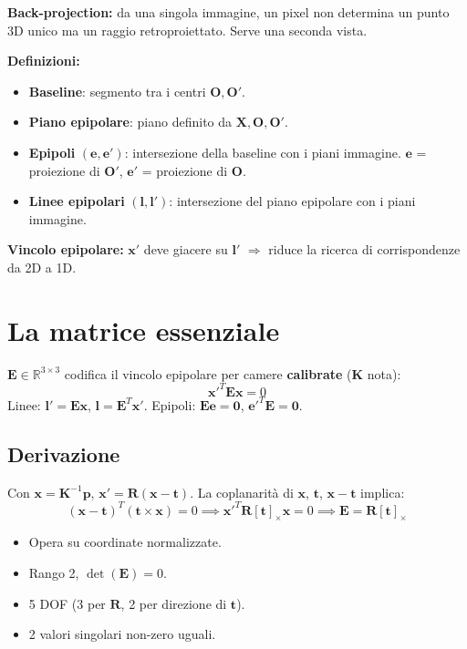 \documentclass[12pt, a4paper]{report}
\newcommand{\R}{\mathbb{R}}
\begin{document}
\textbf{Back-projection:} da una singola immagine, un pixel non determina un
punto 3D unico ma un raggio retroproiettato. Serve una seconda vista.

\textbf{Definizioni:}
\begin{itemize}
  \item \textbf{Baseline}: segmento tra i centri $\mathbf{O},\mathbf{O}'$.
  \item \textbf{Piano epipolare}: piano definito da $\mathbf{X},\mathbf{O},\mathbf{O}'$.
  \item \textbf{Epipoli} $(\mathbf{e},\mathbf{e}')$: intersezione della baseline
        con i piani immagine. $\mathbf{e}$ = proiezione di $\mathbf{O}'$,
        $\mathbf{e}'$ = proiezione di $\mathbf{O}$.
  \item \textbf{Linee epipolari} $(\mathbf{l},\mathbf{l}')$: intersezione del
        piano epipolare con i piani immagine.
\end{itemize}

\textbf{Vincolo epipolare:} $\mathbf{x}'$ deve giacere su $\mathbf{l}'$
$\Rightarrow$ riduce la ricerca di corrispondenze da 2D a 1D.

\section{La matrice essenziale}

\begin{defbox}
$\mathbf{E}\in\R^{3\times3}$ codifica il vincolo epipolare per camere
\textbf{calibrate} ($\mathbf{K}$ nota):
\[
  \boxed{\mathbf{x}'^T\mathbf{E}\mathbf{x}=0}
\]
Linee: $\mathbf{l}'=\mathbf{E}\mathbf{x}$, $\mathbf{l}=\mathbf{E}^T\mathbf{x}'$.
Epipoli: $\mathbf{Ee}=\mathbf{0}$, $\mathbf{e}'^T\mathbf{E}=\mathbf{0}$.
\end{defbox}

\subsection{Derivazione}

Con $\mathbf{x}=\mathbf{K}^{-1}\mathbf{p}$, $\mathbf{x}'=\mathbf{R}(\mathbf{x}-\mathbf{t})$.
La coplanarità di $\mathbf{x}$, $\mathbf{t}$, $\mathbf{x}-\mathbf{t}$ implica:
\[
  (\mathbf{x}-\mathbf{t})^T(\mathbf{t}\times\mathbf{x})=0
  \implies \mathbf{x}'^T\mathbf{R}[\mathbf{t}]_\times\mathbf{x}=0
  \implies \mathbf{E}=\mathbf{R}[\mathbf{t}]_\times
\]

\begin{propbox}
\begin{itemize}
  \item Opera su coordinate normalizzate.
  \item Rango 2, $\det(\mathbf{E})=0$.
  \item 5 DOF (3 per $\mathbf{R}$, 2 per direzione di $\mathbf{t}$).
  \item 2 valori singolari non-zero uguali.
\end{itemize}
\end{propbox}
\end{document}
